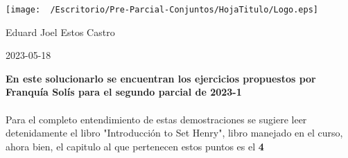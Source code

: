 \documentclass{article}
\begin{document}
\begin{titlepage}
  \centering

  \vspace*{\fill}
  \texttt{[image: ~/Escritorio/Pre-Parcial-Conjuntos/HojaTitulo/Logo.eps]}\par\vspace{2cm}
  \par
  \vspace{0.2cm}

  \Large{Eduard Joel Estos Castro\par}
  \vspace*{\fill}
  \normalsize 2023-05-18 
\end{titlepage}
\clearpage

\textbf{En este solucionarlo se encuentran los ejercicios propuestos por Franquía Solís para el segundo parcial de 2023-1}\\ 
\\ 
Para el completo entendimiento de estas demostraciones se sugiere leer detenidamente el libro "Introducción to Set Henry"\cite{Jech}, libro manejado en el curso, ahora bien, el capitulo al que pertenecen estos puntos es el \textbf{4}
\end{document}
